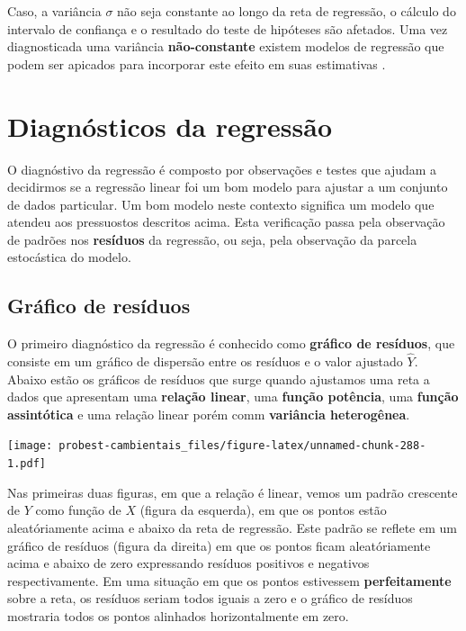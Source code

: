 \documentclass[
]{book}
\begin{document}
Caso, a variância \(\sigma\) não seja constante ao longo da reta de regressão, o cálculo do intervalo de confiança e o resultado do teste de hipóteses são afetados. Uma vez diagnosticada uma variância \textbf{não-constante} existem modelos de regressão que podem ser apicados para incorporar este efeito em suas estimativas \citep{zuur2009mixed}.

\hypertarget{diagnuxf3sticos-da-regressuxe3o}{%
\section{Diagnósticos da regressão}\label{diagnuxf3sticos-da-regressuxe3o}}

O diagnóstivo da regressão é composto por observações e testes que ajudam a decidirmos se a regressão linear foi um bom modelo para ajustar a um conjunto de dados particular. Um bom modelo neste contexto significa um modelo que atendeu aos pressuostos descritos acima. Esta verificação passa pela observação de padrões nos \textbf{resíduos} da regressão, ou seja, pela observação da parcela estocástica do modelo.

\hypertarget{gruxe1fico-de-resuxedduos}{%
\subsection{Gráfico de resíduos}\label{gruxe1fico-de-resuxedduos}}

O primeiro diagnóstico da regressão é conhecido como \textbf{gráfico de resíduos}, que consiste em um gráfico de dispersão entre os resíduos e o valor ajustado \(\hat{Y}\). Abaixo estão os gráficos de resíduos que surge quando ajustamos uma reta a dados que apresentam uma \textbf{relação linear}, uma \textbf{função potência}, uma \textbf{função assintótica} e uma relação linear porém comm \textbf{variância heterogênea}.

\texttt{[image: probest-cambientais\_files/figure-latex/unnamed-chunk-288-1.pdf]}

Nas primeiras duas figuras, em que a relação é linear, vemos um padrão crescente de \(Y\) como função de \(X\) (figura da esquerda), em que os pontos estão aleatóriamente acima e abaixo da reta de regressão. Este padrão se reflete em um gráfico de resíduos (figura da direita) em que os pontos ficam aleatóriamente acima e abaixo de zero expressando resíduos positivos e negativos respectivamente. Em uma situação em que os pontos estivessem \textbf{perfeitamente} sobre a reta, os resíduos seriam todos iguais a zero e o gráfico de resíduos mostraria todos os pontos alinhados horizontalmente em zero.
\end{document}
